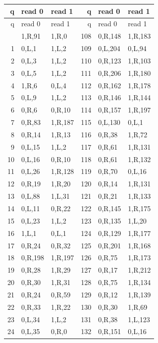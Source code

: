 \begingroup\small\ttfamily
\setlength{\tabcolsep}{9pt}
\begin{longtable}{rll@{\hspace{12mm}}rll}
\toprule
q & read 0 & read 1 & q & read 0 & read 1\\\midrule
\endfirsthead
\toprule
q & read 0 & read 1 & q & read 0 & read 1\\\midrule
\endhead
\bottomrule\endfoot
0 & 1,R,91 & 1,R,0 & 108 & 0,R,148 & 1,R,183\\
1 & 0,L,1 & 1,L,2 & 109 & 0,L,204 & 0,L,94\\
2 & 0,L,3 & 1,L,2 & 110 & 0,R,123 & 1,R,103\\
3 & 0,L,5 & 1,L,2 & 111 & 0,R,206 & 1,R,180\\
4 & 1,R,6 & 0,L,4 & 112 & 0,R,162 & 1,R,178\\
5 & 0,L,9 & 1,L,2 & 113 & 0,R,146 & 1,R,144\\
6 & 0,R,6 & 0,R,10 & 114 & 0,R,157 & 1,R,197\\
7 & 0,R,83 & 1,R,187 & 115 & 0,L,130 & 0,L,1\\
8 & 0,R,14 & 1,R,13 & 116 & 0,R,38 & 1,R,72\\
9 & 0,L,15 & 1,L,2 & 117 & 0,R,61 & 1,R,131\\
10 & 0,L,16 & 0,R,10 & 118 & 0,R,61 & 1,R,132\\
11 & 0,L,26 & 1,R,128 & 119 & 0,R,70 & 0,L,16\\
12 & 0,R,19 & 1,R,20 & 120 & 0,R,14 & 1,R,131\\
13 & 0,L,88 & 1,L,31 & 121 & 0,R,21 & 1,R,133\\
14 & 0,L,11 & 0,R,22 & 122 & 0,R,145 & 1,R,175\\
15 & 0,L,23 & 1,L,2 & 123 & 0,R,135 & 1,L,20\\
16 & 1,L,1 & 0,L,1 & 124 & 0,R,129 & 1,R,177\\
17 & 0,R,24 & 0,R,32 & 125 & 0,R,201 & 1,R,168\\
18 & 0,R,198 & 1,R,197 & 126 & 0,R,75 & 1,R,173\\
19 & 0,R,28 & 1,R,29 & 127 & 0,R,17 & 1,R,212\\
20 & 0,R,30 & 1,R,31 & 128 & 0,R,75 & 1,R,134\\
21 & 0,R,24 & 0,R,59 & 129 & 0,R,12 & 1,R,139\\
22 & 0,R,33 & 1,R,22 & 130 & 0,R,30 & 1,R,69\\
23 & 0,L,34 & 1,L,2 & 131 & 0,R,38 & 1,L,123\\
24 & 0,L,35 & 0,R,0 & 132 & 0,R,151 & 0,L,16\\

\end{longtable}
